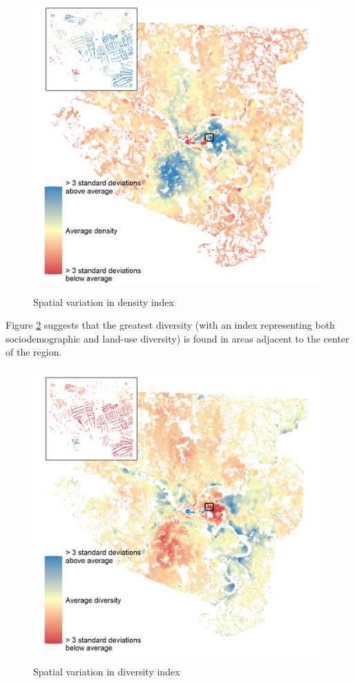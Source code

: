 \documentclass[
]{book}
\begin{document}
\begin{figure}
\includegraphics[width=1\linewidth]{04_figures/dense} \caption{Spatial variation in density index}\label{fig:dense-map}
\end{figure}

Figure \ref{fig:diverse-map} suggests that the greatest diversity
(with an index representing both sociodemographic and land-use
diversity) is found in areas adjacent to the center of the region.

\begin{figure}
\includegraphics[width=1\linewidth]{04_figures/diverse} \caption{Spatial variation in diversity index}\label{fig:diverse-map}
\end{figure}
\end{document}
